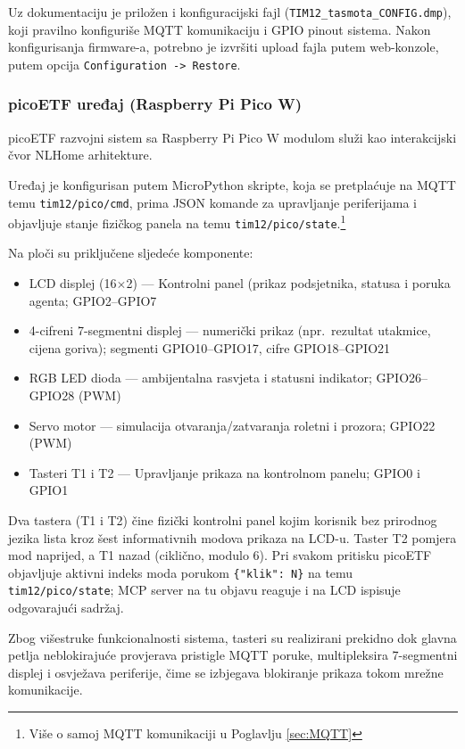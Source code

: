 \documentclass[11pt,a4paper]{article}
\begin{document}
Uz dokumentaciju je priložen i konfiguracijski fajl (\texttt{TIM12\_tasmota\_CONFIG.dmp}),
koji pravilno konfiguriše MQTT komunikaciju i GPIO pinout sistema.
Nakon konfigurisanja firmware-a, potrebno je izvršiti upload fajla putem web-konzole,
putem opcija \texttt{Configuration -> Restore}.

\subsubsection{picoETF uređaj (Raspberry Pi Pico W)}

picoETF razvojni sistem sa Raspberry Pi Pico W modulom služi kao interakcijski
čvor NLHome arhitekture.

Uređaj je konfigurisan putem MicroPython skripte, koja se pretplaćuje na MQTT temu
\texttt{tim12/pico/cmd}, prima JSON komande za upravljanje periferijama i objavljuje stanje
fizičkog panela na temu \texttt{tim12/pico/state}.\footnote{Više o samoj MQTT komunikaciji u Poglavlju \ref{sec:MQTT}}


Na ploči su priključene sljedeće komponente:

\begin{itemize}[nosep]
      \item LCD displej (16$\times$2) --- Kontrolni panel (prikaz podsjetnika, statusa i poruka agenta; GPIO2--GPIO7
      \item 4-cifreni 7-segmentni displej --- numerički prikaz (npr.\ rezultat utakmice, cijena goriva); segmenti GPIO10--GPIO17, cifre GPIO18--GPIO21
      \item RGB LED dioda --- ambijentalna rasvjeta i statusni indikator; GPIO26--GPIO28 (PWM)
      \item Servo motor --- simulacija otvaranja/zatvaranja roletni i prozora; GPIO22 (PWM)
      \item Tasteri T1 i T2 --- Upravljanje prikaza na kontrolnom panelu; GPIO0 i GPIO1
\end{itemize}


Dva tastera (T1 i T2) čine fizički kontrolni panel kojim korisnik bez prirodnog jezika
lista kroz šest informativnih modova prikaza na LCD-u. Taster T2 pomjera mod naprijed, a
T1 nazad (ciklično, modulo 6). Pri svakom pritisku picoETF objavljuje aktivni indeks moda
porukom \texttt{\{"klik": N\}} na temu \texttt{tim12/pico/state}; MCP server na tu objavu
reaguje i na LCD ispisuje odgovarajući sadržaj.


Zbog višestruke funkcionalnosti sistema, tasteri su realizirani prekidno
dok glavna petlja neblokirajuće provjerava pristigle MQTT poruke, multipleksira
7-segmentni displej i osvježava periferije, čime se izbjegava blokiranje prikaza tokom
mrežne komunikacije.
\end{document}
